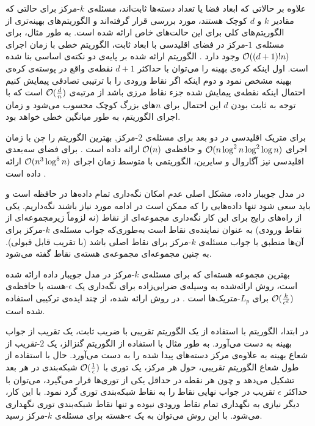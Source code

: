 علاوه بر حالاتی که ابعاد فضا یا تعداد دسته‌ها ثابت‌اند، مسئله‌ی $k$-مرکز برای حالتی که مقادیر $k$ و $d$ کوچک هستند، مورد بررسی قرار گرفته‌اند و الگوریتم‌های بهینه‌تری از الگوریتم‌های کلی برای این حالت‌های خاص ارائه شده است.
به طور مثال، برای مسئله‌ی $1$-مرکز در فضای اقلیدسی با ابعاد ثابت، الگوریتم خطی با زمان اجرای $\mathcal{O}((d+1)! n)$ وجود دارد .
الگوریتم ارائه شده بر پایه‌ی دو نکته‌ی اساسی بنا شده است.
اول اینکه کره‌ی بهینه را می‌توان با حداکثر $d+1$ نقطه‌ی واقع در پوسته‌ی کره‌ی بهینه مشخص نمود و دوم اینکه اگر نقاط ورودی را با ترتیبی تصادفی پیمایش کنیم احتمال اینکه نقطه‌ی پیمایش شده جزء نقاط مرزی باشد از مرتبه‌ی $\mathcal{O}(\frac{d}{n})$ است که با توجه به ثابت بودن $d$ این احتمال برای $n$های بزرگ کوچک محسوب می‌شود و زمان اجرای الگوریتم، به طور میانگین خطی خواهد بود. 


برای متریک اقلیدسی در دو بعد برای مسئله‌ی $2$-مرکز, بهترین الگوریتم را چن با زمان اجرای $\mathcal{O}(n \log^2{n} \log^2{\log{n}})$ و حافظه‌ی $\mathcal{O}(n)$ ارائه داده است .
برای فضای سه‌بعدی اقلیدسی نیز آگاروال و سایرین، الگوریتمی با متوسط زمان اجرای $\mathcal{O}(n^3\log^8{n})$ ارائه داده است .


در مدل جویبار داده، مشکل اصلی عدم امکان نگه‌داری تمام داده‌ها در حافظه است و باید سعی شود تنها داده‌هایی را که ممکن است در ادامه مورد نیاز باشند نگه‌داریم.
یکی از راه‌های رایج برای این کار نگه‌داری مجموعه‌ای از نقاط (نه لزوماً زیرمجموعه‌ای از نقاط ورودی) به عنوان نماینده‌ی نقاط است به‌طوری‌که جواب مسئله‌ی $k$-مرکز برای آن‌ها منطبق با جواب مسئله‌ی $k$-مرکز برای نقاط اصلی باشد (با تقریب قابل قبولی).
به چنین مجموعه‌ای مجموعه‌ی هسته‌ی نقاط گفته می‌شود. 

بهترین مجموعه هسته‌ای که برای مسئله‌ی $k$-مرکز در مدل جویبار داده ارائه شده است، روش ارائه‌شده به وسیله‌ی ضرابی‌زاده برای نگه‌داری یک $\epsilon$-هسته با حافظه‌ی $\mathcal{O}(\frac{k}{\epsilon^d})$ برای $L_p$-متریک‌ها است .
در روش ارائه شده، از چند ایده‌ی ترکیبی استفاده شده است. 

در ابتدا، الگوریتم با استفاده از یک الگوریتم تقریبی با ضریب ثابت، یک تقریب از جواب بهینه به دست می‌آورد.
به طور مثال با استفاده از الگوریتم گنزالز، یک $2$-تقریب از شعاع بهینه به علاوه‌ی مرکز دسته‌های پیدا شده را به دست می‌آورد.
حال با استفاده از طول شعاع الگوریتم تقریبی، حول هر مرکز، یک توری با $\mathcal{O}(\frac{1}{\epsilon})$ شبکه‌بندی در هر بعد تشکیل می‌دهد و چون هر نقطه در حداقل یکی از توری‌ها قرار می‌گیرد، می‌توان با حداکثر $\epsilon$ تقریب در جواب نهایی نقاط را به نقاط شبکه‌بندی توری گرد نمود.
با این کار، دیگر نیازی به نگهداری تمام نقاط ورودی نبوده و تنها نقاط شبکه‌بندی توری نگهداری می‌شود.
با این روش می‌توان به یک $\epsilon$-هسته برای مسئله‌ی $k$-مرکز رسید. 


